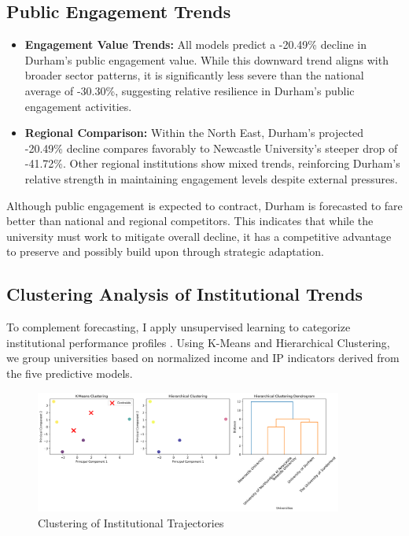 \documentclass[journal,onecolumn, 10pt,draftclsnofoot]{IEEEtran}
\begin{document}
\subsection{Public Engagement Trends}

\begin{itemize}
    \item \textbf{Engagement Value Trends:} All models predict a -20.49\% decline in Durham's public engagement value. While this downward trend aligns with broader sector patterns, it is significantly less severe than the national average of -30.30\%, suggesting relative resilience in Durham's public engagement activities.
    
    \item \textbf{Regional Comparison:} Within the North East, Durham's projected -20.49\% decline compares favorably to Newcastle University's steeper drop of -41.72\%. Other regional institutions show mixed trends, reinforcing Durham's relative strength in maintaining engagement levels despite external pressures.
\end{itemize}

Although public engagement is expected to contract, Durham is forecasted to fare better than national and regional competitors. This indicates that while the university must work to mitigate overall decline, it has a competitive advantage to preserve and possibly build upon through strategic adaptation.

\subsection{Clustering Analysis of Institutional Trends}

To complement forecasting, I apply unsupervised learning to categorize institutional performance profiles \cite{everitt2011cluster}. Using K-Means and Hierarchical Clustering, we group universities based on normalized income and IP indicators derived from the five predictive models.



\begin{figure}[h]
\centering
\includegraphics[width=0.9\textwidth]{Fig/figure44.clustering_analysis.png}
\caption{Clustering of Institutional Trajectories}
\label{fig:clustering-analysis}
\end{figure}
\end{document}
